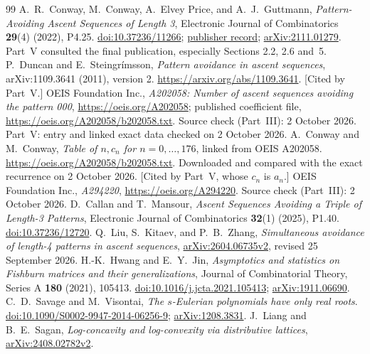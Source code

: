 \documentclass[11pt,letterpaper]{article}
\theoremstyle{remark}
\begin{document}
\begin{thebibliography}{99}
A.~R.~Conway, M.~Conway, A.~Elvey Price, and A.~J.~Guttmann,
\emph{Pattern-Avoiding Ascent Sequences of Length 3},
Electronic Journal of Combinatorics \textbf{29}(4) (2022), P4.25.
\href{https://doi.org/10.37236/11266}{doi:10.37236/11266};
\href{https://www.combinatorics.org/ojs/index.php/eljc/article/view/v29i4p25}{publisher record};
\href{https://arxiv.org/abs/2111.01279}{arXiv:2111.01279}.
Part~V consulted the final publication, especially Sections 2.2, 2.6 and~5.
P.~Duncan and E.~Steingr\'imsson,
\emph{Pattern avoidance in ascent sequences},
arXiv:1109.3641 (2011), version 2.
\url{https://arxiv.org/abs/1109.3641}. [Cited by Part~V.]
OEIS Foundation Inc., \emph{A202058: Number of ascent sequences avoiding the pattern 000},
\url{https://oeis.org/A202058}; published coefficient file, \url{https://oeis.org/A202058/b202058.txt}. Source check (Part~III): 2 October 2026. Part~V: entry and linked exact data checked on 2 October 2026.
A.~Conway and M.~Conway,
\emph{Table of $n,c_n$ for $n=0,\ldots,176$},
linked from OEIS A202058.
\url{https://oeis.org/A202058/b202058.txt}.
Downloaded and compared with the exact recurrence on 2 October 2026. [Cited by Part~V, whose $c_n$ is $a_n$.]
OEIS Foundation Inc., \emph{A294220}, \url{https://oeis.org/A294220}. Source check (Part~III): 2 October 2026.
D.~Callan and T.~Mansour, \emph{Ascent Sequences Avoiding a Triple of Length-3 Patterns}, Electronic Journal of Combinatorics \textbf{32}(1) (2025), P1.40.
\href{https://doi.org/10.37236/12720}{doi:10.37236/12720}.
Q.~Liu, S.~Kitaev, and P.~B.~Zhang, \emph{Simultaneous avoidance of length-4 patterns in ascent sequences}, \href{https://arxiv.org/abs/2604.06735v2}{arXiv:2604.06735v2}, revised 25 September 2026.
H.-K.~Hwang and E.~Y.~Jin, \emph{Asymptotics and statistics on Fishburn matrices and their generalizations}, Journal of Combinatorial Theory, Series A \textbf{180} (2021), 105413.
\href{https://doi.org/10.1016/j.jcta.2021.105413}{doi:10.1016/j.jcta.2021.105413}; \href{https://arxiv.org/abs/1911.06690}{arXiv:1911.06690}.
C.~D.~Savage and M.~Visontai, \emph{The $s$-Eulerian polynomials have only real roots}.
\href{https://doi.org/10.1090/S0002-9947-2014-06256-9}{doi:10.1090/S0002-9947-2014-06256-9}; \href{https://arxiv.org/abs/1208.3831}{arXiv:1208.3831}.
J.~Liang and B.~E.~Sagan, \emph{Log-concavity and log-convexity via distributive lattices}, \href{https://arxiv.org/abs/2408.02782v2}{arXiv:2408.02782v2}.

\end{thebibliography}
\end{document}
